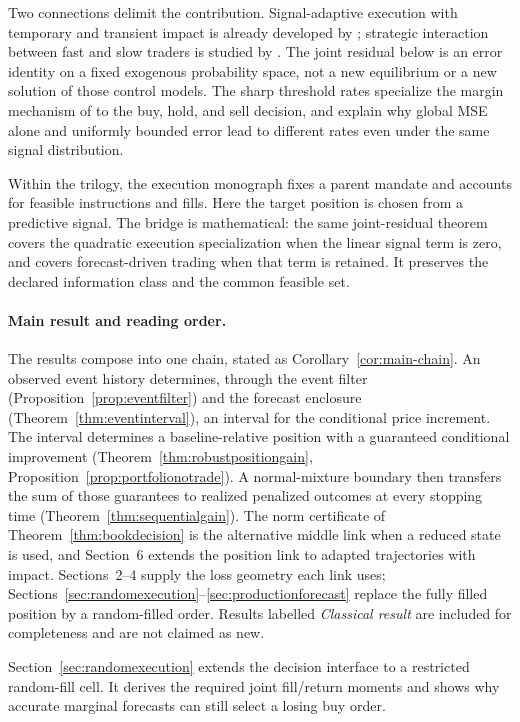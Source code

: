 \documentclass[11pt]{article}
\theoremstyle{plain}
\theoremstyle{definition}
\theoremstyle{remark}
\begin{document}
Two connections delimit the contribution. Signal-adaptive execution
with temporary and transient impact is already developed by
\citet{NeumanVoss2022}; strategic interaction between fast and slow
traders is studied by \citet{ContMicheliNeuman2025}. The joint residual
below is an error identity on a fixed exogenous probability space,
not a new equilibrium or a new solution of those control models.
The sharp threshold rates specialize the margin mechanism of
\citet{AudibertTsybakov2007} to the buy, hold, and sell decision, and
explain why global MSE alone and uniformly bounded error lead to
different rates even under the same signal distribution.

Within the trilogy, the execution monograph
\citep{NoguerAlonso2026Execution} fixes a parent mandate and accounts
for feasible instructions and fills. Here the target position is
chosen from a predictive signal. The bridge is mathematical:
the same joint-residual theorem covers the quadratic execution
specialization when the linear signal term is zero, and covers
forecast-driven trading when that term is retained. It preserves
the declared information class and the common feasible set.

\paragraph{Main result and reading order.}
The results compose into one chain, stated as Corollary~\ref{cor:main-chain}.
An observed event history determines, through the event filter
(Proposition~\ref{prop:eventfilter}) and the forecast enclosure
(Theorem~\ref{thm:eventinterval}), an interval for the conditional price
increment. The interval determines a baseline-relative position with a
guaranteed conditional improvement (Theorem~\ref{thm:robustpositiongain},
Proposition~\ref{prop:portfolionotrade}). A normal-mixture boundary then transfers the
sum of those guarantees to realized penalized outcomes at every stopping time
(Theorem~\ref{thm:sequentialgain}). The norm certificate of Theorem~\ref{thm:bookdecision} is the
alternative middle link when a reduced state is used, and Section~6 extends the
position link to adapted trajectories with impact. Sections~2--4 supply the
loss geometry each link uses; Sections~\ref{sec:randomexecution}--\ref{sec:productionforecast} replace the fully filled position
by a random-filled order. Results labelled \emph{Classical result} are included
for completeness and are not claimed as new.


Section~\ref{sec:randomexecution} extends the decision interface to a restricted random-fill cell. It derives the required joint fill/return moments and shows why accurate marginal forecasts can still select a losing buy order.
\end{document}
